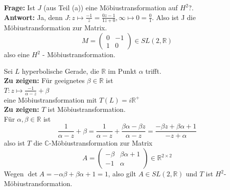 \begin{problem*}[2b]
\textbf{Frage: }Ist $ J $ (aus Teil (a)) eine Möbiustransformation auf $ H^2 $?.\\
\textbf{Antwort: } Ja, denn $ J: z \mapsto \frac{-1}{z} = \frac{0z - 1}{1z + 0}, \infty \mapsto 0 = \frac{0}{1}$. Also ist J die Möbiustransformation zur Matrix.
\begin{equation*}
  M = \begin{pmatrix}
  0 & -1 \\
  1 & 0 
  \end{pmatrix} \in SL(2,\mathbb{R})
\end{equation*}
also eine $H^2$ - Möbiustransformation.
\end{problem*}

\begin{problem*}[3a]
Sei $ L $ hyperbolische Gerade, die $\mathbb{R}$ im Punkt $\alpha$ trifft.\\
\textbf{Zu zeigen:} Für geeignetes $\beta \in \mathbb{R}$ ist \\
$ T: z \mapsto \frac{-1}{\alpha - z} + \beta$ \\
eine Möbiustransformation mit $T(L) = i \mathbb{R}^{ + }$ \\
\textbf{Zu zeigen: } $ T $ ist Möbiustransformation. \\
Für $\alpha, \beta \in \mathbb{R}$ ist
\begin{equation*}
   \frac{1}{\alpha -z} + \beta = \frac{1}{\alpha-z} + \frac{\beta \alpha - \beta z}{\alpha - z} = \frac{-\beta z + \beta \alpha + 1}{-z +\alpha}
 \end{equation*} 
 also ist $ T $ die $ \mathbb{C} $-Möbiustransformation zur Matrix
 \begin{equation*}
   A = \begin{pmatrix}
   - \beta & \beta \alpha + 1 \\
   - 1 & \alpha 
   \end{pmatrix} \in \mathbb{R}^{ 2 \times 2 }
 \end{equation*}
 Wegen $\det A = - \alpha \beta + \beta \alpha + 1 = 1$, also gilt $ A \in SL(2, \mathbb{R})$ und $ T $ ist $H^2$-Möbiustransformation.
\end{problem*}
